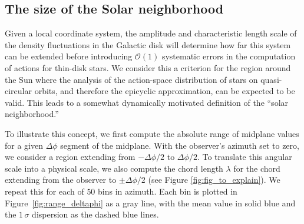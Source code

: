 \documentclass[twocolumn]{aastex62}
\begin{document}
\subsection{The size of the Solar neighborhood} \label{sssec:neighborhood}

Given a local coordinate system, the amplitude and characteristic length scale
of the density fluctuations in the Galactic disk will determine how far this
system can be extended before introducing $\mathcal{O}(1)$ systematic errors
in the computation of actions for thin-disk stars. We consider this a
criterion for the region around the Sun where the analysis of the action-space
distribution of stars on quasi-circular orbits, and therefore the epicyclic
approximation, can be expected to be valid. This leads to a somewhat
dynamically motivated definition of the ``solar neighborhood.''

To illustrate this concept, we first compute the absolute range of midplane
values for a given $\Delta \phi$ segment of the midplane. With the observer's
azimuth set to zero, we consider a region extending from $-\Delta \phi/2$ to
$\Delta\phi/2$. To translate this angular scale into a physical scale, we also
compute the chord length $\lambda$ for the chord extending from the observer
to $\pm \Delta\phi/2$ (see Figure \ref{fig:fig_to_explain}). We repeat this
for each of $50$ bins in azimuth. Each bin is plotted in
Figure~\ref{fig:range_deltaphi} as a gray line, with the mean value in solid
blue and the $1\,\sigma$ dispersion as the dashed blue lines.

\begin{figure*}
\caption{A cartoon explanation of Figure~\ref{fig:range_deltaphi}. An observer
is placed at the blue x in the plane of a backgrround galaxy (lime). For a
given $\Delta \phi$ (blue) centered on the observer, we record the range of
midplane values for this section of the Solar circle (orange). We plot the
value of the range against the value of $\Delta \phi$. We are also able to
convert the value of $\Delta \phi$ into a chord length (pink), which we plot
as a secondary, upper $x$-axis. We repeat the procedure for each initial
$\phi$ (gray lines), and also compute the mean and $\pm1\,\sigma$ values (dark
blue).}
\label{fig:fig_to_explain}
\end{figure*}
\end{document}

